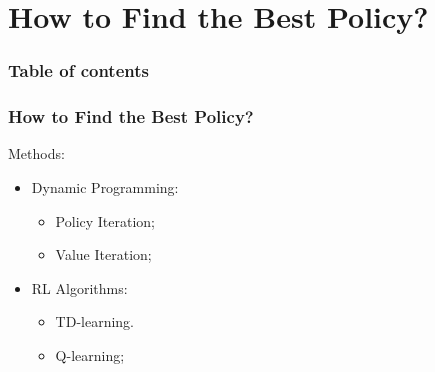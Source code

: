 \section{How to Find the Best Policy?}

\begin{frame}
    \frametitle{Table of contents}
    \tableofcontents
\end{frame} 



\begin{frame}
    \frametitle{How to Find the Best Policy?}
    Methods:
    \begin{itemize}
        \item Dynamic Programming:
        \begin{itemize}
            \item Policy Iteration;
            \item Value Iteration;
        \end{itemize}
        \item RL Algorithms:
        \begin{itemize}
            \item TD-learning.
            \item Q-learning;
        \end{itemize}
    \end{itemize}
\end{frame} 


